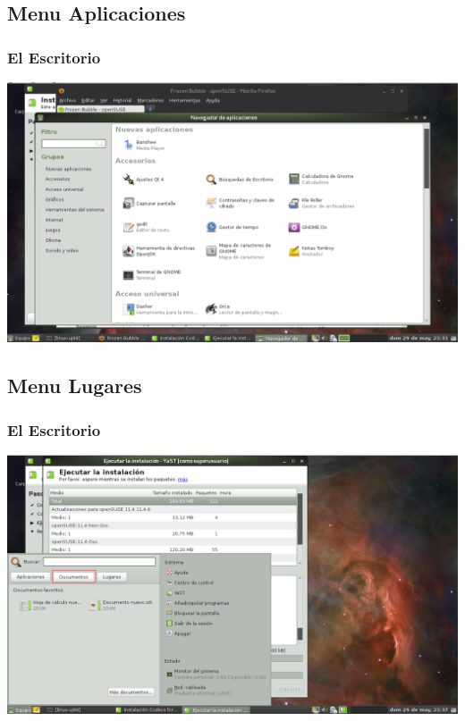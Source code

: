 \documentclass{beamer}
\begin{document}
\subsection{Menu Aplicaciones}
\begin{frame}
\frametitle{El Escritorio}
\includegraphics[height=0.8\textheight]{desktop2.png} \hspace*{7.3cm}
\end{frame} 

\subsection{Menu Lugares}
\begin{frame}
\frametitle{El Escritorio}
\includegraphics[height=0.8\textheight]{desktop3.png} \hspace*{7.3cm}
\end{frame} 
\end{document}
